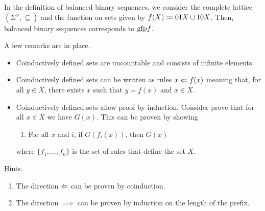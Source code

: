 {{

In the definition of balanced binary sequences, we consider the complete lattice $(\Sigma^\omega, \subseteq)$ and the function on sets given by $f(X) \coloneqq 01X \cup 10X$. 
Then, balanced binary sequences corresponds to $\mathrm{gfp} f$.	


A few remarks are in place.
\begin{itemize}
	\item 
		Coinductively defined sets are uncountable and consists of infinite elements.
	\item 
		Coinductively defined sets can be written as rules $x \Leftarrow f(x)$ meaning that, for all $y \in X$, there exists $x$ such that $y = f(x)$ and $x \in X$.
	\item 
		Coinductively defined sets allow proof by induction.
		Consider prove that for all $x \in X$ we have $G(x)$.
		This can be proven by showing
		\begin{enumerate}
			\item For all $x$ and $i$, if $G(f_i(x))$, then $G(x)$
		\end{enumerate}
		where $\{f_1, \ldots, f_n\}$ is the set of rules that define the set $X$.
\end{itemize}



Hints.
\begin{enumerate}
	\item The direction $\Leftarrow$ can be proven by coinduction.
	\item The direction $\implies$ can be proven by induction on the length of the prefix.
\end{enumerate}

}} %
